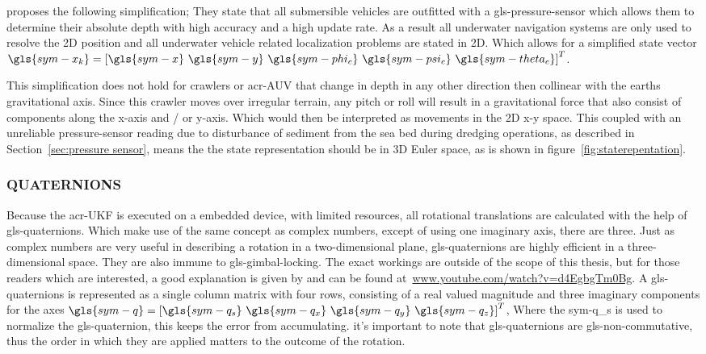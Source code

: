 \citet{bahr_cooperative_2009} proposes the following simplification; They state that all submersible vehicles are
outfitted with a \gls{gls-pressure-sensor} which allows them to determine their absolute depth with high accuracy and a high
update rate. As a result all underwater navigation systems are only used to resolve the 2D position and all underwater
vehicle related localization problems are stated in 2D. Which allows for a simplified state vector \( \gls{sym-x_k} =
\left[\gls{sym-x} ~\gls{sym-y} ~\gls{sym-phi_c} ~\gls{sym-psi_c} ~\gls{sym-theta_c}\right]^T \).

This simplification does not hold for crawlers or \gls{acr-AUV} that change in depth in any other direction then
collinear with the earths gravitational axis. Since this crawler moves over irregular terrain, any pitch or roll will
result in a gravitational force that also consist of components along the x-axis and / or y-axis. Which would then be
interpreted as movements in the 2D x-y space. This coupled with an unreliable pressure-sensor reading due to
disturbance of sediment from the sea bed during dredging operations, as described in Section~\ref{sec:pressure sensor},
means the the state representation should be in 3D Euler space, as is shown in figure~\ref{fig:staterepentation}.

\subsubsection{QUATERNIONS}

Because the \gls{acr-UKF} is executed on a embedded device, with limited resources, all rotational translations are
calculated with the help of \gls{gls-quaternion}s. Which make use of the same concept as complex numbers, except of
using one imaginary axis, there are three. Just as complex numbers are very useful in describing a rotation in a
two-dimensional plane, \gls{gls-quaternion}s are highly efficient in a three-dimensional space. They are also immune to
\gls{gls-gimbal-lock}ing. The exact workings are outside of the scope of this thesis, but for those readers which are
interested, a good explanation is given by \citet{3blue1brown_quaternions_2018} and can be found
at~\url{www.youtube.com/watch?v=d4EgbgTm0Bg}. A \gls{gls-quaternion}s is represented as a single column matrix with four
rows, consisting  of a real valued magnitude and three imaginary components for the axes \(\gls{sym-q} =
\left[\gls{sym-q_s} ~\gls{sym-q_x} ~\gls{sym-q_y}  ~\gls{sym-q_z} \right]^T \), Where the \gls{sym-q_s} is used to
normalize the \gls{gls-quaternion}, this keeps the error from accumulating. it's important to note that
\gls{gls-quaternion}s are \gls{gls-non-commutative}, thus the order in which they are applied matters to the outcome of
the rotation.

